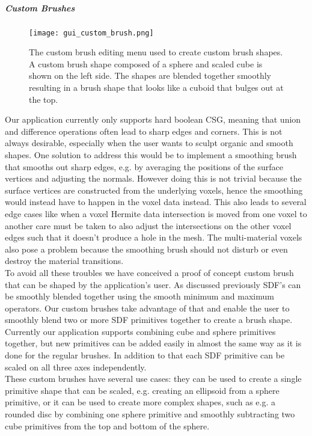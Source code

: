 \subparagraph{Custom Brushes}

\begin{figure}
\centering
\captionsetup{width=0.8\textwidth}
\texttt{[image: gui\_custom\_brush.png]}
\caption{The custom brush editing menu used to create custom brush shapes. A custom brush shape composed of a sphere and scaled cube is shown on the left side. The shapes are blended together smoothly resulting in a brush shape that looks like a cuboid that bulges out at the top.}
\label{fig:gui_custom_brush}
\end{figure}

Our application currently only supports hard boolean CSG, meaning that union and difference operations often lead to sharp edges and corners. This is not always desirable, especially when the user wants to sculpt organic and
smooth shapes. One solution to address this would be to implement a smoothing brush that smooths out sharp edges, e.g. by averaging the positions of the surface vertices and adjusting the normals. However doing this is not trivial
because the surface vertices are constructed from the underlying voxels, hence the smoothing would instead have to happen in the voxel data instead. This also leads to several edge cases like when a voxel Hermite data intersection is moved
from one voxel to another care must be taken to also adjust the intersections on the other voxel edges such that it doesn't produce a hole in the mesh. The multi-material voxels also pose a problem because the smoothing brush should
not disturb or even destroy the material transitions.\\
To avoid all these troubles we have conceived a proof of concept custom brush that can be shaped by the application's user. As discussed previously SDF's can be smoothly blended together using the smooth minimum and maximum operators.
Our custom brushes take advantage of that and enable the user to smoothly blend two or more SDF primitives together to create a brush shape. Currently our application supports combining cube and sphere primitives together, but new
primitives can be added easily in almost the same way as it is done for the regular brushes. In addition to that each SDF primitive can be scaled on all three axes independently.\\
These custom brushes have several use cases: they can be used to create a single primitive shape that can be scaled, e.g. creating an ellipsoid from a sphere primitive, or it can be used to create more complex shapes, such as e.g.
a rounded disc by combining one sphere primitive and smoothly subtracting two cube primitives from the top and bottom of the sphere.

